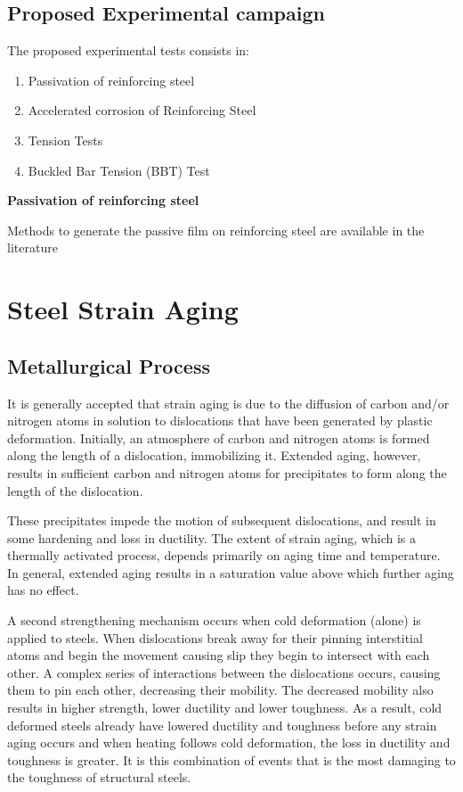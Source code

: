 \subsection{Proposed Experimental campaign}

The proposed experimental tests consists in:
\begin{enumerate}
	\item Passivation of reinforcing steel
	\item Accelerated corrosion  of Reinforcing Steel
	\item Tension Tests
	\item Buckled Bar Tension (BBT) Test
\end{enumerate}

\textbf{Passivation of reinforcing steel}

Methods to generate the passive film on reinforcing steel are available in the literature \cite{Ghods2009}

\section{Steel Strain Aging}

\subsection{Metallurgical Process}

It is generally accepted that strain aging is due to the diffusion of carbon and/or nitrogen atoms in solution to dislocations that have been generated by plastic deformation. Initially, an atmosphere of carbon and nitrogen atoms is formed along the length of a dislocation, immobilizing it. Extended aging, however, results in sufficient carbon and nitrogen atoms for precipitates to form along the length of the dislocation.

These precipitates impede the motion of subsequent dislocations, and result in some hardening and loss in ductility. The extent of strain aging, which is a thermally activated process, depends primarily on aging time and temperature. In general, extended aging results in a saturation value above which further aging has no effect.

A second strengthening mechanism occurs when cold deformation (alone) is applied to steels. When dislocations break away for their pinning interstitial atoms and begin the movement causing slip they begin to intersect with each other. A complex series of interactions between the dislocations occurs, causing them to pin each other, decreasing their mobility. The decreased mobility also results in higher strength, lower ductility and lower toughness. As a result, cold deformed steels already have lowered ductility and toughness before any strain aging occurs and when heating follows cold deformation, the loss in ductility and toughness is greater. It is this combination of events that is the most damaging to the toughness of structural steels.

